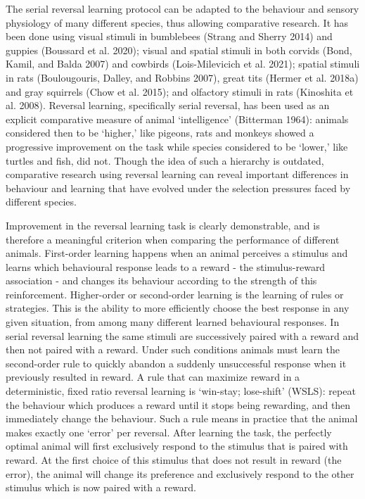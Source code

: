 \documentclass[
]{article}
\begin{document}
The serial reversal learning protocol can be adapted to the behaviour and sensory physiology of many different species, thus allowing comparative research. It has been done using visual stimuli in bumblebees (Strang and Sherry 2014) and guppies (Boussard et al. 2020); visual and spatial stimuli in both corvids (Bond, Kamil, and Balda 2007) and cowbirds (Lois-Milevicich et al. 2021); spatial stimuli in rats (Boulougouris, Dalley, and Robbins 2007), great tits (Hermer et al. 2018a) and gray squirrels (Chow et al. 2015); and olfactory stimuli in rats (Kinoshita et al. 2008). Reversal learning, specifically serial reversal, has been used as an explicit comparative measure of animal `intelligence' (Bitterman 1964): animals considered then to be `higher,' like pigeons, rats and monkeys showed a progressive improvement on the task while species considered to be `lower,' like turtles and fish, did not. Though the idea of such a hierarchy is outdated, comparative research using reversal learning can reveal important differences in behaviour and learning that have evolved under the selection pressures faced by different species.

Improvement in the reversal learning task is clearly demonstrable, and is therefore a meaningful criterion when comparing the performance of different animals. First-order learning happens when an animal perceives a stimulus and learns which behavioural response leads to a reward - the stimulus-reward association - and changes its behaviour according to the strength of this reinforcement. Higher-order or second-order learning is the learning of rules or strategies. This is the ability to more efficiently choose the best response in any given situation, from among many different learned behavioural responses. In serial reversal learning the same stimuli are successively paired with a reward and then not paired with a reward. Under such conditions animals must learn the second-order rule to quickly abandon a suddenly unsuccessful response when it previously resulted in reward. A rule that can maximize reward in a deterministic, fixed ratio reversal learning is `win-stay; lose-shift' (WSLS): repeat the behaviour which produces a reward until it stops being rewarding, and then immediately change the behaviour. Such a rule means in practice that the animal makes exactly one `error' per reversal. After learning the task, the perfectly optimal animal will first exclusively respond to the stimulus that is paired with reward. At the first choice of this stimulus that does not result in reward (the error), the animal will change its preference and exclusively respond to the other stimulus which is now paired with a reward.
\end{document}
